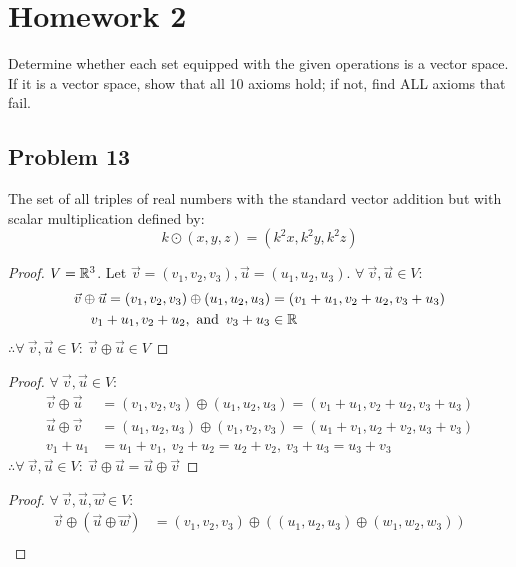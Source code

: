 \documentclass{article}
\begin{document}
\section*{Homework 2}

Determine whether each set equipped with the given operations is a vector space.
If it is a vector space, show that all 10 axioms hold; if not, find ALL axioms that fail.

\subsection*{Problem 13}
The set of all triples of real numbers with the standard vector addition but with scalar multiplication defined by:
\[
    k \odot (x,y,z) = (k^2x,k^2y,k^2z)
\]
\begin{enumerate}
    \begin{proof}
        $V = \mathbb{R}^3$. Let $\vec{v}=(v_1,v_2,v_3),\vec{u}=(u_1,u_2,u_3)$. $\forall~\vec{v},\vec{u} \in V$:
        \begin{align*}
            \vec{v} \oplus \vec{u} = (v_1,v_2,v_3) \oplus (u_1,u_2,u_3) & = (v_1+u_1,v_2+u_2,v_3+u_3) \\
            v_1+u_1,v_2+u_2, \operatorname{~\text{and}~} v_3+u_3                              & \in \mathbb{R}
        \end{align*}
        $\therefore \forall~\vec{v},\vec{u} \in V:~\vec{v} \oplus \vec{u} \in V$
    \end{proof}
    \begin{proof}
        $\forall~\vec{v},\vec{u} \in V$:
        \begin{align*}
            \vec{v} \oplus \vec{u} & = (v_1,v_2,v_3) \oplus (u_1,u_2,u_3) = (v_1+u_1,v_2+u_2,v_3+u_3) \\
            \vec{u} \oplus \vec{v} & = (u_1,u_2,u_3) \oplus (v_1,v_2,v_3) = (u_1+v_1,u_2+v_2,u_3+v_3) \\
            v_1+u_1                & = u_1+v_1,~v_2+u_2 = u_2+v_2,~v_3+u_3 = u_3+v_3
        \end{align*}
        $\therefore \forall~\vec{v},\vec{u} \in V:~\vec{v} \oplus \vec{u} = \vec{u} \oplus \vec{v}$
    \end{proof}
    \begin{proof}
        $\forall~\vec{v},\vec{u},\vec{w} \in V$:
        \begin{align*}
            \vec{v} \oplus (\vec{u} \oplus \vec{w}) & = (v_1,v_2,v_3) \oplus ((u_1,u_2,u_3) \oplus (w_1,w_2,w_3)) \\

\end{align*}
\end{proof}
\end{enumerate}
\end{document}
